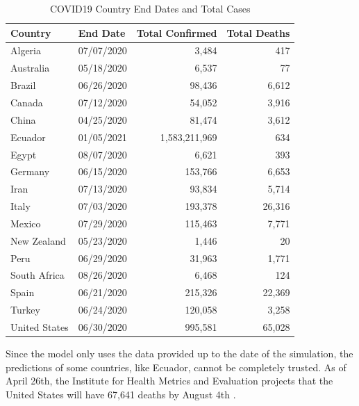 \documentclass{homework}
\begin{document}
\begin{table}[H]
  \caption{COVID19 Country End Dates and Total Cases}
  \label{Task 2 Results}
  \centering
  \begin{tabular}{llrr}
    \toprule
    Country       & End Date   & Total Confirmed & Total Deaths \\
    \midrule
    Algeria       & 07/07/2020 & 3,484           & 417          \\
    Australia     & 05/18/2020 & 6,537           & 77           \\
    Brazil        & 06/26/2020 & 98,436          & 6,612        \\
    Canada        & 07/12/2020 & 54,052          & 3,916        \\
    China         & 04/25/2020 & 81,474          & 3,612        \\
    Ecuador       & 01/05/2021 & 1,583,211,969   & 634          \\
    Egypt         & 08/07/2020 & 6,621           & 393          \\
    Germany       & 06/15/2020 & 153,766         & 6,653        \\
    Iran          & 07/13/2020 & 93,834          & 5,714        \\
    Italy         & 07/03/2020 & 193,378         & 26,316       \\
    Mexico        & 07/29/2020 & 115,463         & 7,771        \\
    New Zealand   & 05/23/2020 & 1,446           & 20           \\
    Peru          & 06/29/2020 & 31,963          & 1,771        \\
    South Africa  & 08/26/2020 & 6,468           & 124          \\
    Spain         & 06/21/2020 & 215,326         & 22,369       \\
    Turkey        & 06/24/2020 & 120,058         & 3,258        \\
    United States & 06/30/2020 & 995,581         & 65,028       \\
    \bottomrule
  \end{tabular}
\end{table}

Since the model only uses the data provided up to the date of the simulation, the predictions of some countries, like Ecuador, cannot be completely trusted. As of April 26th, the Institute for Health Metrics and Evaluation projects that the United States will have 67,641 deaths by August 4th \cite{ihme}.\\
\end{document}
